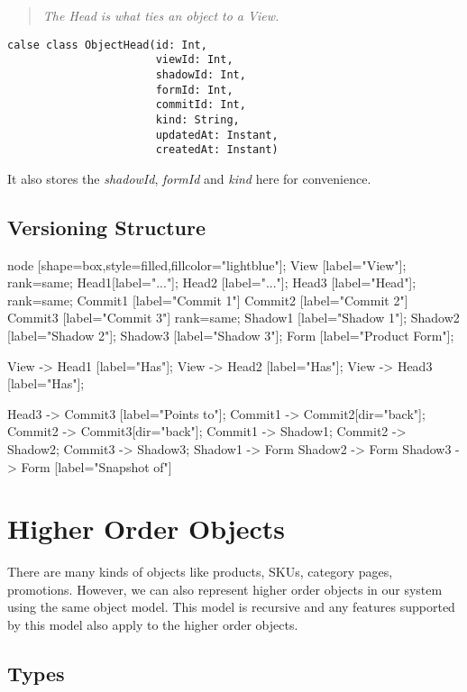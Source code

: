 \documentclass[11pt]{article}
\begin{document}
\begin{quote}
    \emph{The Head is what ties an object to a View.}
\end{quote}

\begin{lstlisting}
calse class ObjectHead(id: Int,
                       viewId: Int,
                       shadowId: Int,
                       formId: Int,
                       commitId: Int,
                       kind: String,
                       updatedAt: Instant,
                       createdAt: Instant)
\end{lstlisting}

It also stores the \emph{shadowId}, \emph{formId} and \emph{kind} here for convenience.

\subsection{Versioning Structure}
 {
    node [shape=box,style=filled,fillcolor="lightblue"];
    View [label="View"];
    {
        rank=same;
        Head1[label="..."];
        Head2 [label="..."];
        Head3 [label="Head"];
    }
    {
        rank=same;
        Commit1 [label="Commit 1"]
        Commit2 [label="Commit 2"]
        Commit3 [label="Commit 3"]
    }
    {
        rank=same;
        Shadow1 [label="Shadow 1"];
        Shadow2 [label="Shadow 2"];
        Shadow3 [label="Shadow 3"];
    }
    Form [label="Product Form"];

    View -> Head1 [label="Has"];
    View -> Head2 [label="Has"];
    View -> Head3 [label="Has"];

    Head3 -> Commit3 [label="Points to"];
    Commit1 -> Commit2[dir="back"];
    Commit2 -> Commit3[dir="back"];
    Commit1 -> Shadow1;
    Commit2 -> Shadow2;
    Commit3 -> Shadow3;
    Shadow1 -> Form 
    Shadow2 -> Form 
    Shadow3 -> Form [label="Snapshot of"]
}

\newpage
\section{Higher Order Objects}

There are many kinds of objects like products, SKUs, category pages, promotions.
However, we can also represent higher order objects in our system using the same
object model. This model is recursive and any features supported by this model
also apply to the higher order objects.

\subsection{Types}
\end{document}
